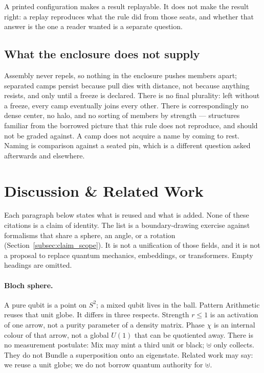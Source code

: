 \documentclass[12pt, a4paper]{article}
\begin{document}
A printed configuration makes a result replayable. It does not make
the result right: a replay reproduces what the rule did from those seats, and whether that answer is the one a reader wanted is a
separate question.

\subsection{What the enclosure does not supply}
\label{subsec:enclosure_open}
Assembly never repels, so nothing in the enclosure pushes members
apart; separated camps persist because pull dies with distance, not
because anything resists, and only until a freeze is declared. There
is no final plurality: left without a freeze, every camp eventually
joins every other. There is correspondingly no dense center, no halo,
and no sorting of members by strength --- structures familiar from
the borrowed picture that this rule does not reproduce, and should not
be graded against. A camp does not acquire a name by coming to rest.
Naming is comparison against a seated pin, which is a different
question asked afterwards and elsewhere.


\section{Discussion \& Related Work}
\label{sec:related}

Each paragraph below states what is reused and what is added. None of
these citations is a claim of identity. The list is a
boundary-drawing exercise against formalisms that share a sphere, an
angle, or a rotation
(Section~\ref{subsec:claim_scope}). It is not a unification of those
fields, and it is not a proposal to replace quantum mechanics,
embeddings, or transformers. Empty headings are omitted.

\paragraph{Bloch sphere.}
A pure qubit is a point on $S^2$; a mixed qubit lives in the ball.
Pattern Arithmetic reuses that unit globe. It differs in three
respects. Strength $r\le 1$ is an activation of one arrow, not a purity
parameter of a density matrix. Phase $\chi$ is an internal colour of
that arrow, not a global $U(1)$ that can be quotiented away. There is
no measurement postulate: Mix may mint a third unit or black; $\uplus$
only collects. They do not Bundle a superposition onto an eigenstate. Related work
may say: we reuse a unit globe; we do not borrow quantum authority for
$\uplus$.
\end{document}
